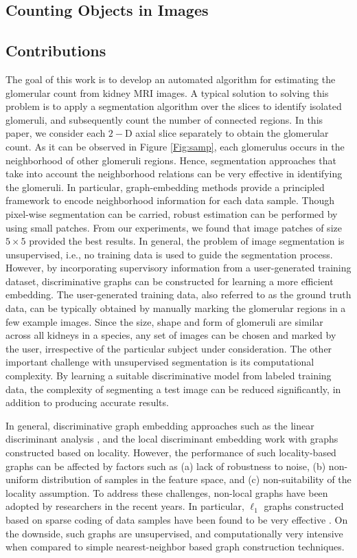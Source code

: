\subsection{Counting Objects in Images}


\subsection{Contributions}

The goal of this work is to develop an automated algorithm for estimating the glomerular count from kidney MRI images. A typical solution to solving this problem is to apply a segmentation algorithm over the slices to identify isolated glomeruli, and subsequently count the number of connected regions. In this paper, we consider each $2-$D axial slice separately to obtain the glomerular count. As it can be observed in Figure \ref{Fig:samp}, each glomerulus occurs in the neighborhood of other glomeruli regions. Hence, segmentation approaches that take into account the neighborhood relations can be very effective in identifying the glomeruli. In particular, graph-embedding methods provide a principled framework to encode neighborhood information for each data sample. Though pixel-wise segmentation can be carried, robust estimation can be performed by using small patches. From our experiments, we found that image patches of size $5 \times 5$ provided the best results. In general, the problem of image segmentation is unsupervised, i.e., no training data is used to guide the segmentation process. However, by incorporating supervisory information from a user-generated training dataset, discriminative graphs can be constructed for learning a more efficient embedding. The user-generated training data, also referred to as the ground truth data, can be typically obtained by manually marking the glomerular regions in a few example images. Since the size, shape and form of glomeruli are similar across all kidneys in a species, any set of images can be chosen and marked by the user, irrespective of the particular subject under consideration. The other important challenge with unsupervised segmentation is its computational complexity. By learning a suitable discriminative model from labeled training data, the complexity of segmenting a test image can be reduced significantly, in addition to producing accurate results.

In general, discriminative graph embedding approaches such as the linear discriminant analysis \cite{}, and the local discriminant embedding \cite{} work with graphs constructed based on locality. However, the performance of such locality-based graphs can be affected by factors such as (a) lack of robustness to noise, (b) non-uniform distribution of samples in the feature space, and (c) non-suitability of the locality assumption. To address these challenges, non-local graphs have been adopted by researchers in the recent years. In particular, $\ell_1$ graphs constructed based on sparse coding of data samples have been found to be very effective \cite{}. On the downside, such graphs are unsupervised, and computationally very intensive when compared to simple nearest-neighbor based graph construction techniques.

